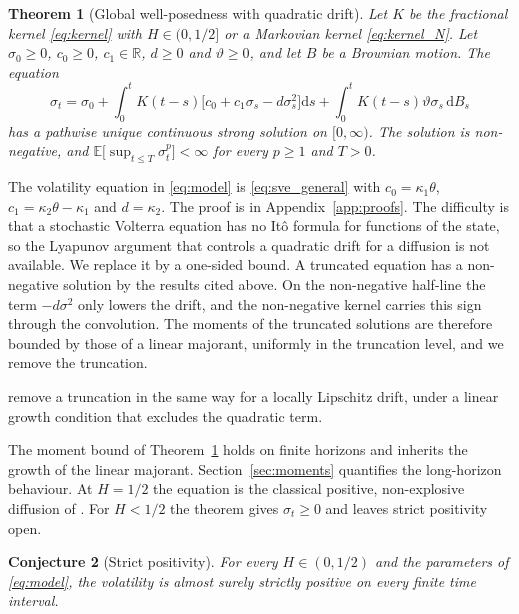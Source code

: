 \documentclass{rQUF2e}
\theoremstyle{plain}
\newtheorem{theorem}{Theorem}[section]
\newtheorem{conjecture}[theorem]{Conjecture}
\theoremstyle{definition}
\theoremstyle{remark}
\newcommand{\D}{\mathrm{d}}
\newcommand{\E}{\mathbb{E}}
\begin{document}
\begin{theorem}[Global well-posedness with quadratic drift]\label{thm:wellposed}
Let $K$ be the fractional kernel \eqref{eq:kernel} with $H\in(0,1/2]$ or a Markovian kernel \eqref{eq:kernel_N}. Let $\sigma_0\ge0$, $c_0\ge0$, $c_1\in\mathbb R$, $d\ge0$ and $\vartheta\ge0$, and let $B$ be a Brownian motion. The equation
\begin{equation}\label{eq:sve_general}
\sigma_t=\sigma_0+\int_0^tK(t-s)\big[c_0+c_1\sigma_s-d\sigma_s^2\big]\D s+\int_0^tK(t-s)\vartheta\sigma_s\,\D B_s
\end{equation}
has a pathwise unique continuous strong solution on $[0,\infty)$. The solution is non-negative, and $\E\big[\sup_{t\le T}\sigma_t^p\big]<\infty$ for every $p\ge1$ and $T>0$.
\end{theorem}

The volatility equation in \eqref{eq:model} is \eqref{eq:sve_general} with $c_0=\kappa_1\theta$, $c_1=\kappa_2\theta-\kappa_1$ and $d=\kappa_2$. The proof is in Appendix~\ref{app:proofs}. The difficulty is that a stochastic Volterra equation has no It\^o formula for functions of the state, so the Lyapunov argument that controls a quadratic drift for a diffusion is not available. We replace it by a one-sided bound. A truncated equation has a non-negative solution by the results cited above. On the non-negative half-line the term $-d\sigma^2$ only lowers the drift, and the non-negative kernel carries this sign through the convolution. The moments of the truncated solutions are therefore bounded by those of a linear majorant, uniformly in the truncation level, and we remove the truncation.

\citet{PannierJacquier2019} remove a truncation in the same way for a locally Lipschitz drift, under a linear growth condition that excludes the quadratic term.

The moment bound of Theorem~\ref{thm:wellposed} holds on finite horizons and inherits the growth of the linear majorant. Section~\ref{sec:moments} quantifies the long-horizon behaviour. At $H=1/2$ the equation is the classical positive, non-explosive diffusion of \citet{SeppRakhmonov2023}. For $H<1/2$ the theorem gives $\sigma_t\ge0$ and leaves strict positivity open.

\begin{conjecture}[Strict positivity]\label{conj:wellposed}
For every $H\in(0,1/2)$ and the parameters of \eqref{eq:model}, the volatility is almost surely strictly positive on every finite time interval.
\end{conjecture}
\end{document}
